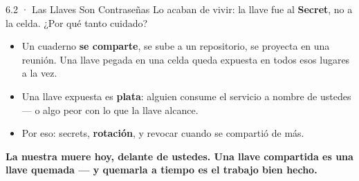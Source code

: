 \documentclass[aspectratio=169, 11pt]{beamer}
\begin{document}
\begin{frame}[shrink=5]{6.2 · Las Llaves Son Contraseñas}
  \vspace{4pt}
  {\footnotesize\color{textMuted}
   Lo acaban de vivir: la llave fue al \textbf{Secret}, no a la celda. ¿Por
   qué tanto cuidado?}
  \vspace{6pt}
  {\footnotesize\color{textMuted}
  \begin{itemize}\setlength{\itemsep}{5pt}
    \item[{\color{arcaRed}\scriptsize\faArrowRight}]
      Un cuaderno \textbf{se comparte}, se sube a un repositorio, se
      proyecta en una reunión. Una llave pegada en una celda queda expuesta
      en todos esos lugares a la vez.
    \item[{\color{arcaRed}\scriptsize\faArrowRight}]
      Una llave expuesta es \textbf{plata}: alguien consume el servicio a
      nombre de ustedes --- o algo peor con lo que la llave alcance.
    \item[{\color{codeGreen}\scriptsize\faArrowRight}]
      Por eso: secrets, \textbf{rotación}, y revocar cuando se compartió de
      más.
  \end{itemize}}
  \vspace{7pt}
  \begin{tcolorbox}[colback=arcaGray, colframe=arcaDark, boxrule=0pt,
    leftrule=4pt, arc=3pt, left=10pt, right=10pt, top=6pt, bottom=6pt]
    {\footnotesize\color{arcaDark}\bfseries
     La nuestra muere hoy, delante de ustedes. Una llave compartida es una
     llave quemada --- y quemarla a tiempo es el trabajo bien hecho.}
  \end{tcolorbox}
\end{frame}
\end{document}
